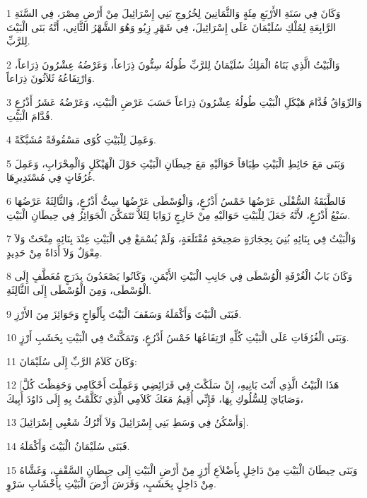 \par 1 وَكَانَ فِي سَنَةِ الأَرْبَعِ مِئَةٍ وَالثَّمَانِينَ لِخُرُوجِ بَنِي إِسْرَائِيلَ مِنْ أَرْضِ مِصْرَ، فِي السَّنَةِ الرَّابِعَةِ لِمُلْكِ سُلَيْمَانَ عَلَى إِسْرَائِيلَ، فِي شَهْرِ زِيُو وَهُوَ الشَّهْرُ الثَّانِي، أَنَّهُ بَنَى الْبَيْتَ لِلرَّبِّ.
\par 2 وَالْبَيْتُ الَّذِي بَنَاهُ الْمَلِكُ سُلَيْمَانُ لِلرَّبِّ طُولُهُ سِتُّونَ ذِرَاعاً، وَعَرْضُهُ عِشْرُونَ ذِرَاعاً، وَارْتِفَاعُهُ ثَلاَثُونَ ذِرَاعاً.
\par 3 وَالرِّوَاقُ قُدَّامَ هَيْكَلِ الْبَيْتِ طُولُهُ عِشْرُونَ ذِرَاعاً حَسَبَ عَرْضِ الْبَيْتِ، وَعَرْضُهُ عَشَرُ أَذْرُعٍ قُدَّامَ الْبَيْتِ.
\par 4 وَعَمِلَ لِلْبَيْتِ كُوًى مَسْقُوفَةً مُشَبَّكَةً.
\par 5 وَبَنَى مَعَ حَائِطِ الْبَيْتِ طِبَاقاً حَوَالَيْهِ مَعَ حِيطَانِ الْبَيْتِ حَوْلَ الْهَيْكَلِ وَالْمِحْرَابِ، وَعَمِلَ غُرُفَاتٍ فِي مُسْتَدِيرِهَا.
\par 6 فَالطَّبَقَةُ السُّفْلَى عَرْضُهَا خَمْسُ أَذْرُعٍ، وَالْوُسْطَى عَرْضُهَا سِتُّ أَذْرُعٍ، وَالثَّالِثَةُ عَرْضُهَا سَبْعُ أَذْرُعٍ، لأَنَّهُ جَعَلَ لِلْبَيْتِ حَوَالَيْهِ مِنْ خَارِجٍ زَوَايَا لِئَلاَّ تَتَمَكَّنَ الْجَوَائِزُ فِي حِيطَانِ الْبَيْتِ.
\par 7 وَالْبَيْتُ فِي بِنَائِهِ بُنِيَ بِحِجَارَةٍ صَحِيحَةٍ مُقْتَلَعَةٍ، وَلَمْ يُسْمَعْ فِي الْبَيْتِ عِنْدَ بِنَائِهِ مِنْحَتٌ وَلاَ مِعْوَلٌ وَلاَ أَدَاةٌ مِنْ حَدِيدٍ.
\par 8 وَكَانَ بَابُ الْغُرْفَةِ الْوُسْطَى فِي جَانِبِ الْبَيْتِ الأَيْمَنِ، وَكَانُوا يَصْعَدُونَ بِدَرَجٍ مُعَطَّفٍ إِلَى الْوُسْطَى، وَمِنَ الْوُسْطَى إِلَى الثَّالِثَةِ.
\par 9 فَبَنَى الْبَيْتَ وَأَكْمَلَهُ وَسَقَفَ الْبَيْتَ بِأَلْوَاحٍ وَجَوَائِزَ مِنَ الأَرْزِ.
\par 10 وَبَنَى الْغُرُفَاتِ عَلَى الْبَيْتِ كُلِّهِ ارْتِفَاعُهَا خَمْسُ أَذْرُعٍ، وَتَمَكَّنَتْ فِي الْبَيْتِ بِخَشَبِ أَرْزٍ.
\par 11 وَكَانَ كَلاَمُ الرَّبِّ إِلَى سُلَيْمَانَ:
\par 12 [هَذَا الْبَيْتُ الَّذِي أَنْتَ بَانِيهِ، إِنْ سَلَكْتَ فِي فَرَائِضِي وَعَمِلْتَ أَحْكَامِي وَحَفِظْتَ كُلَّ وَصَايَايَ لِلسُّلُوكِ بِهَا، فَإِنِّي أُقِيمُ مَعَكَ كَلاَمِي الَّذِي تَكَلَّمْتُ بِهِ إِلَى دَاوُدَ أَبِيكَ،
\par 13 وَأَسْكُنُ فِي وَسَطِ بَنِي إِسْرَائِيلَ وَلاَ أَتْرُكُ شَعْبِي إِسْرَائِيلَ].
\par 14 فَبَنَى سُلَيْمَانُ الْبَيْتَ وَأَكْمَلَهُ.
\par 15 وَبَنَى حِيطَانَ الْبَيْتِ مِنْ دَاخِلٍ بِأَضْلاَعِ أَرْزٍ مِنْ أَرْضِ الْبَيْتِ إِلَى حِيطَانِ السَّقْفِ، وَغَشَّاهُ مِنْ دَاخِلٍ بِخَشَبٍ، وَفَرَشَ أَرْضَ الْبَيْتِ بِأَخْشَابِ سَرْوٍ.
